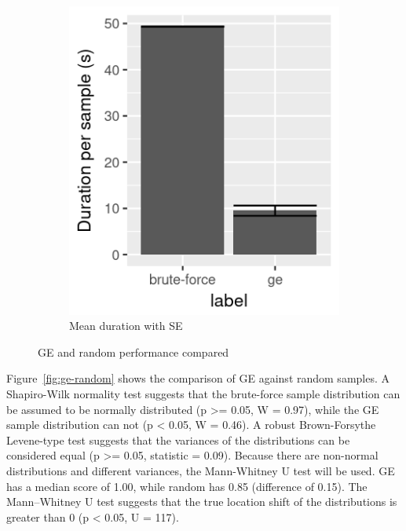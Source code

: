 \begin{figure}
\begin{subfigure}{0.4\textwidth}
        \includegraphics[width=\textwidth]{figures/ge-random-duration}
        \caption{Mean duration with SE}
        \label{fig:ge-random-duration}
    \end{subfigure}
    \caption{GE and random performance compared}
\end{figure}

Figure~\ref{fig:ge-random} shows the comparison of GE against random samples.
A Shapiro-Wilk normality test suggests that the brute-force sample distribution can be assumed to be normally distributed (p >= 0.05, W = 0.97), while the GE sample distribution can not (p < 0.05, W = 0.46).
A robust Brown-Forsythe Levene-type test suggests that the variances of the distributions can be considered equal (p >= 0.05, statistic = 0.09).
Because there are non-normal distributions and different variances, the Mann-Whitney U test will be used.
GE has a median score of 1.00, while random has 0.85 (difference of 0.15).
The Mann–Whitney U test suggests that the true location shift of the distributions is greater than 0 (p < 0.05, U = 117).

